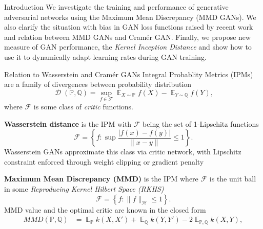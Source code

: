\documentclass[xcolor={table}]{beamer}
\DeclareMathOperator{\D}{\mathcal{D}}
\DeclareMathOperator*{\E}{\mathbb{E}}
\newcommand{\F}{\mathcal{F}}
\newcommand{\h}{\mathcal{H}}
\newcommand{\PP}{\mathbb P}
\newcommand{\QQ}{\mathbb Q}
\begin{document}
\begin{frame}{}
\maketitle
\begin{columns}[T, totalwidth=\textwidth]

  \begin{column}{.32\textwidth}
    \begin{block}{Introduction}
      We investigate the training and performance of generative adversarial networks 
      using the Maximum Mean Discrepancy (MMD GANs). We also clarify the situation with 
      bias in GAN loss functions raised by recent work and relation between MMD GANs and Cram\'er GAN.
      Finally, we propose new measure of GAN performance, the \emph{Kernel Inception Distance} and show
      how to use it to dynamically adapt learning rates during GAN training.
    \end{block}
    \vspace*{-1.2cm}
    \begin{block}{Relation to Wasserstein and Cram\'er GANs} 
      Integral Probablity Metrics (IPMs) are a family of divergences between 
      probability distribution
      \begin{equation}
        \D(\PP, \QQ) = \sup_{f\in\F} \E_{X\sim\PP}f(X) - \E_{Y\sim\QQ}f(Y),
      \end{equation}
      where $\F$ is some class of \emph{critic} functions. 
      \begin{itemize}
        \item{\textbf{Wasserstein distance} is the IPM with $\F$ being the set of 1-Lipschitz functions
          \[  
            \F = \left\{f: \sup\frac{|f(x) - f(y)|}{\|x - y\|}\leq 1\right\}. 
          \]
          Wasserstein GANs approximate this class via critic network, with Lipschitz 
          constraint enforced through weight clipping \citep{wgan} or gradient 
          penalty \citep{wgan-gp}
        \item \textbf{Maximum Mean Discrepancy (MMD)} \citep{mmd-jmlr} is the IPM 
          where $\F$ is the unit ball in some 
          \emph{Reproducing Kernel Hilbert Space (RKHS)}
          \[ \F = \left\{f: \|f\|_{\h} \leq 1\right\}. \]
          MMD value and the optimal critic are known in the closed form
          \begin{align*}
            MMD(\PP, \QQ) &= \E_{\PP} k(X,X') + \E_{\QQ} k(Y,Y') - 2\E_{\PP,\QQ} k(X,Y),\\

\end{align*}}
\end{itemize}
\end{block}
\end{column}
\end{columns}
\end{frame}
\end{document}
